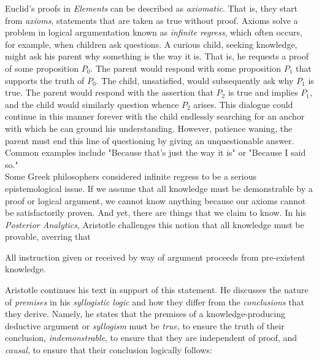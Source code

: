 Euclid's proofs in \textit{Elements} can be described as \textit{axiomatic}. That is, they start from \textit{axioms}, statements that are taken as true without proof. Axioms solve a problem in logical argumentation known as \textit{infinite regress}, which often occurs, for example, when children ask questions. A curious child, seeking knowledge, might ask his parent why something is the way it is. That is, he requests a proof of some proposition $P_0$. The parent would respond with some proposition $P_1$ that supports the truth of $P_0$. The child, unsatisfied, would subsequently ask why $P_1$ is true. The parent would respond with the assertion that $P_2$ is true and implies $P_1$, and the child would similarly question whence $P_2$ arises. This dialogue could continue in this manner forever with the child endlessly searching for an anchor with which he can ground his understanding. However, patience waning, the parent must end this line of questioning by giving an unquestionable answer. Common examples include "Because that's just the way it is" or "Because I said so." \\

Some Greek philosophers considered infinite regress to be a serious epistemological issue. If we assume that all knowledge must be demonstrable by a proof or logical argument, we cannot know anything because our axioms cannot be satisfactorily proven. And yet, there are things that we claim to know. In his \textit{Posterior Analytics}, Aristotle challenges this notion that all knowledge must be provable, averring that \\

\begin{displayquote}
	All instruction given or received by way of argument proceeds from pre-existent knowledge. \\
\end{displayquote} 

Aristotle continues his text in support of this statement. He discusses the nature of \textit{premises} in his \textit{syllogistic logic} and how they differ from the \textit{conclusions} that they derive. Namely, he states that the premises of a knowledge-producing deductive argument or \textit{syllogism} must be \textit{true}, to ensure the truth of their conclusion, \textit{indemonstrable}, to ensure that they are independent of proof, and \textit{causal}, to ensure that their conclusion logically follows: \\

